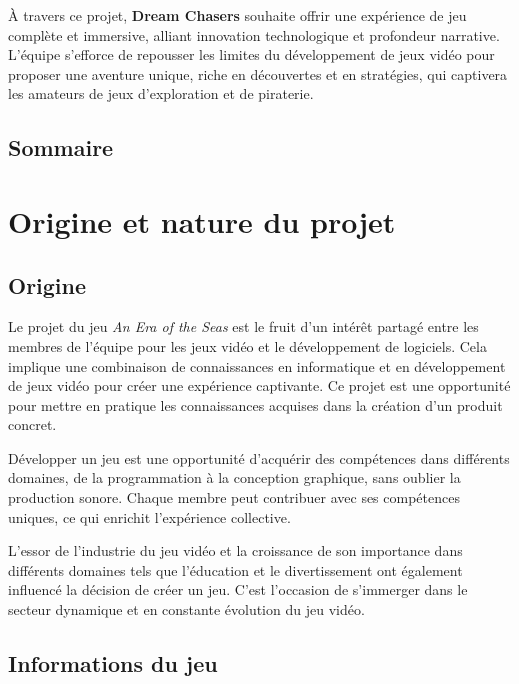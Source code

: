 \documentclass{article}
\begin{document}
À travers ce projet, \textbf{Dream Chasers} souhaite offrir une expérience de jeu complète et immersive, alliant innovation technologique et profondeur narrative. L'équipe s'efforce de repousser les limites du développement de jeux vidéo pour proposer une aventure unique, riche en découvertes et en stratégies, qui captivera les amateurs de jeux d'exploration et de piraterie.

\newpage
\subsection*{Sommaire}
\tableofcontents















\newpage
\section{Origine et nature du projet}
\subsection{Origine}\hfill

Le projet du jeu \textit{An Era of the Seas} est le fruit d’un intérêt partagé entre les membres de l’équipe pour les jeux vidéo et le développement de logiciels. Cela implique une combinaison de connaissances en informatique et en développement de jeux vidéo pour créer une expérience captivante. Ce projet est une opportunité pour mettre en pratique les connaissances acquises dans la création d’un produit concret.

Développer un jeu est une opportunité d'acquérir des compétences dans différents domaines, de la programmation à la conception graphique, sans oublier la production sonore. Chaque membre peut contribuer avec ses compétences uniques, ce qui enrichit l'expérience collective.

L’essor de l’industrie du jeu vidéo et la croissance de son importance dans différents domaines tels que l’éducation et le divertissement ont également influencé la décision de créer un jeu. C’est l’occasion de s’immerger dans le secteur dynamique et en constante évolution du jeu vidéo.





\subsection{Informations du jeu} 
\end{document}
